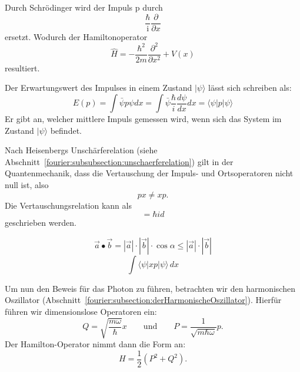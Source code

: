 
Durch Schrödinger wird der Impuls p durch
\begin{equation}
	\frac{\hbar}{\mathrm{i}} \frac{\partial}{\partial x}
\end{equation}
ersetzt.
Wodurch der Hamiltonoperator
\begin{equation}
	\hat{H} = -\frac{\hbar^2}{2m}\frac{\partial^2}{\partial x^2} + V(x)
\end{equation}	
resultiert.

Der Erwartungswert des Impulses in einem Zustand $|\psi\rangle$ lässt sich schreiben als:
\begin{equation}
	E(p) = \int \bar{\psi}p\psi dx
	= \int \bar{\psi} \frac{\hbar}{i} \frac{d\psi}{dx} dx
	= \langle \psi | p | \psi \rangle
\end{equation}
Er gibt an, welcher mittlere Impuls gemessen wird, wenn sich das System im Zustand $|\psi\rangle$ befindet.

Nach Heisenbergs Unschärferelation (siehe Abschnitt~\ref{fourier:subsubsection:unschaerferelation}) gilt in der Quantenmechanik, dass die Vertauschung der Impuls- und Ortsoperatoren nicht null ist, also
\begin{equation}
	px \neq xp.
\end{equation}
Die Vertauschungsrelation kann als
\begin{equation}
	[x, p] = \hbar id
\end{equation}
geschrieben werden.


\begin{equation}
	\vec{a}\bullet\vec{b} = |\vec{a}| \cdot |\vec{b}| \cdot \cos{\alpha} \leq |\vec{a}| \cdot |\vec{b}|
\end{equation}
\begin{equation}
	\int \langle \psi |xp|\psi \rangle\,dx	%
\end{equation}

Um nun den Beweis für das Photon zu führen, betrachten wir den harmonischen Oszillator (Abschnitt~\ref{fourier:subsection:derHarmonischeOszillator}).
Hierfür führen wir dimensionslose Operatoren ein:
\[ 
Q = \sqrt{\frac{m\omega}{\hbar}}x
\qquad\text{und}\qquad
P = \frac{1}{\sqrt{m\hbar\omega}}p.
\]
Der Hamilton-Operator nimmt dann die Form an:
\begin{equation}
	H = \frac{1}{2}(P^2 + Q^2).
\end{equation}

